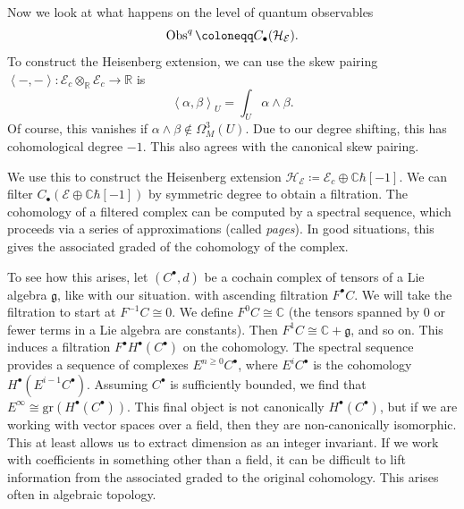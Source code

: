 
Now we look at what happens on the level of quantum observables
\[
	\Obs^q \coloneqq C_{\bullet} (\mathcal{H}_{\mathcal{E}} )
.\]
To construct the Heisenberg extension, we can use the skew pairing $\left\langle -,- \right\rangle : \mathcal{E} _c\otimes_{\mathbb{R} } \mathcal{E} _c \to \mathbb{R} $ is
\[
	\left\langle \alpha ,\beta  \right\rangle_U=\int_{U} \alpha \wedge \beta 
.\]
Of course, this vanishes if $\alpha \wedge \beta \notin \Omega ^3_M(U)$. Due to our degree shifting, this has cohomological degree $-1$. This also agrees with the canonical skew pairing.

We use this to construct the Heisenberg extension $\mathcal{H} _{\mathcal{E} } \coloneqq \mathcal{E} _c\oplus \mathbb{C} \hbar [-1]$. We can filter $C_{\bullet} (\mathcal{E} \oplus \mathbb{C} \hbar [-1])$ by symmetric degree to obtain a filtration. The cohomology of a filtered complex can be computed by a spectral sequence, which proceeds via a series of approximations (called \emph{pages}). In good situations, this gives the associated graded of the cohomology of the complex.

To see how this arises, let $(C^{\bullet},d)$ be a cochain complex of tensors of a Lie algebra $\mathfrak{g} $, like with our situation. with ascending filtration $F^{\bullet} C$. We will take the filtration to start at $F^{-1} C\cong 0$. We define $F^0C \cong \mathbb{C} $ (the tensors spanned by 0 or fewer terms in a Lie algebra are constants). Then $F^1C \cong \mathbb{C} +\mathfrak{g} $, and so on. This induces a filtration $F^{\bullet} H^{\bullet} (C^{\bullet} )$ on the cohomology. The spectral sequence provides a sequence of complexes $E^{n\geq 0} C^{\bullet} $, where $E^iC^{\bullet} $ is the cohomology $H^{\bullet} (E^{i-1} C^{\bullet} )$. Assuming $C^{\bullet} $ is sufficiently bounded, we find that $E^\infty \cong \mathrm{gr} (H^{\bullet} (C^{\bullet} ))$. This final object is not canonically $H^{\bullet} (C^{\bullet} )$, but if we are working with vector spaces over a field, then they are non-canonically isomorphic. This at least allows us to extract dimension as an integer invariant. If we work with coefficients in something other than a field, it can be difficult to lift information from the associated graded to the original cohomology. This arises often in algebraic topology.

